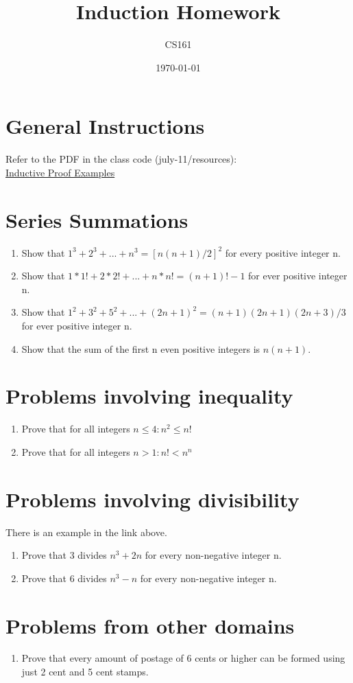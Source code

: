 \documentclass{article}
\title{Induction Homework}
\date{\today}
\author{CS161}
\begin{document}
\maketitle


\section{General Instructions}
Refer to the PDF in the class code (july-11/resources): \\
\href{https://github.com/csu161/Class-code/blob/master/july-11/resources/inductive-proof-examples.pdf}{Inductive Proof Examples}


\section{Series Summations}
\begin{enumerate}
\item Show that \(1^3+2^3+...+n^3=[n(n+1)/2]^2\) for every positive integer n.
\item Show that \(1*1! + 2*2!+...+n*n! = (n+1)!-1\) for ever positive integer n.
\item Show that \(1^2 + 3^2 + 5^2+...+(2n+1)^2=(n+1)(2n+1)(2n+3)/3\) for ever positive integer n.
\item Show that the sum of the first n even positive integers is \(n(n+1)\).
\end{enumerate}


\section{Problems involving inequality}
\begin{enumerate}
\item Prove that for all integers \(n\leq 4: n^2\leq n!\)
\item Prove that for all integers \(n>1 : n!<n^n\)
\end{enumerate}


\section{Problems involving divisibility}
There is an example in the link above.
\begin{enumerate}
\item Prove that 3 divides \(n^3 + 2n\) for every non-negative integer n.
\item Prove that 6 divides \(n^3-n\) for every non-negative integer n.
\end{enumerate}


\section{Problems from other domains}
\begin{enumerate}
\item Prove that every amount of postage of 6 cents or higher can be formed using just 2 cent and 5 cent stamps.
\end{enumerate}
\end{document}
